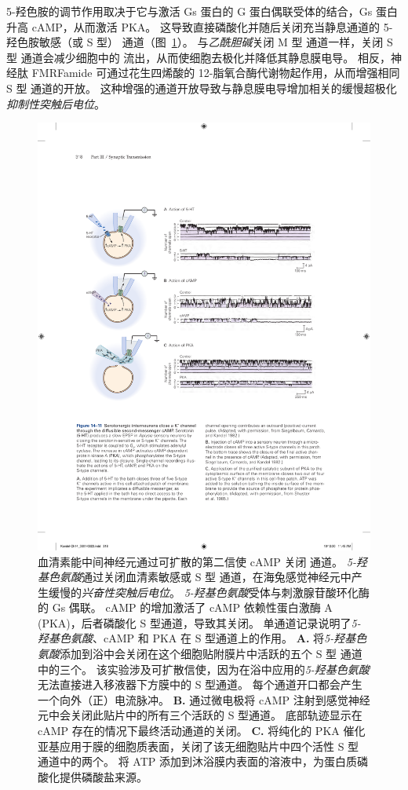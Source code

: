 5-羟色胺的调节作用取决于它与激活 Gs 蛋白的 G 蛋白偶联受体的结合，Gs 蛋白升高 cAMP，从而激活 PKA。
这导致直接磷酸化并随后关闭充当静息通道的 5-羟色胺敏感（或 S 型） 通道（图~\ref{fig:14_11}）。
与\textit{乙酰胆碱}关闭 M 型  通道一样，关闭 S 型  通道会减少细胞中的  流出，从而使细胞去极化并降低其静息膜电导。
相反，神经肽 FMRFamide 可通过花生四烯酸的 12-脂氧合酶代谢物起作用，从而增强相同 S 型  通道的开放。
这种增强的通道开放导致与静息膜电导增加相关的缓慢超极化\textit{抑制性突触后电位}。


\begin{figure}[htbp]
	\centering
	\includegraphics[width=0.85\linewidth]{chap14/fig_14_11}
	\caption{血清素能中间神经元通过可扩散的第二信使 cAMP 关闭  通道。
		\textit{5-羟基色氨酸}通过关闭血清素敏感或 S 型 通道，在海兔感觉神经元中产生缓慢的\textit{兴奋性突触后电位}。
		\textit{5-羟基色氨酸}受体与刺激腺苷酸环化酶的 Gs 偶联。 cAMP 的增加激活了 cAMP 依赖性蛋白激酶 A (PKA)，后者磷酸化 S 型通道，导致其关闭。
		单通道记录说明了\textit{5-羟基色氨酸}、cAMP 和 PKA 在 S 型通道上的作用。
		\textbf{A. }将\textit{5-羟基色氨酸}添加到浴中会关闭在这个细胞贴附膜片中活跃的五个 S 型  通道中的三个。
		该实验涉及可扩散信使，因为在浴中应用的\textit{5-羟基色氨酸}无法直接进入移液器下方膜中的 S 型通道。
		每个通道开口都会产生一个向外（正）电流脉冲\cite{siegelbaum1982serotonin}。
		\textbf{B.} 通过微电极将 cAMP 注射到感觉神经元中会关闭此贴片中的所有三个活跃的 S 型通道。
		底部轨迹显示在 cAMP 存在的情况下最终活动通道的关闭\cite{siegelbaum1982serotonin}。
		\textbf{C.} 将纯化的 PKA 催化亚基应用于膜的细胞质表面，关闭了该无细胞贴片中四个活性 S 型  通道中的两个。
		将 ATP 添加到沐浴膜内表面的溶液中，为蛋白质磷酸化提供磷酸盐来源\cite{shuster1985cyclic}。}
	\label{fig:14_11}
\end{figure}


